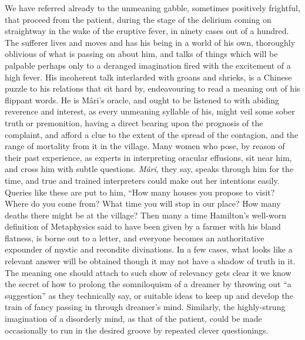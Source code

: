 \documentclass[a4paper, 12pt, oneside, english, twocolumn]{article}
\begin{document}
We have referred already to the unmeaning gabble, sometimes positively frightful, that proceed from the patient, during the stage of the delirium coming on straightway in the wake of the eruptive fever, in ninety cases out of a hundred. The sufferer lives and moves and has his being in a world of his own, thoroughly oblivious of what is passing on about him, and talks of things which will be palpable perhaps only to a deranged imagination fired with the excitement of a high fever. His incoherent talk interlarded with groans and shrieks, is a Chinese puzzle to his relations that sit hard by, endeavouring to read a meaning out of his flippant words. He is Mâri's oracle, and ought to be listened to with abiding reverence and interest, as every unmeaning syllable of his, might veil some sober truth or premonition, having a direct bearing upon the prognosis of the complaint, and afford a clue to the extent of the spread of the contagion, and the range of mortality from it in the village. Many women who pose, by reason of their past experience, as experts in interpreting oracular effusions, sit near him, and cross him with subtle questions. \emph{Mâri}, they say, speaks through him for the time, and true and trained interpreters could make out her intentions easily. Queries like these are put to him, ``How many houses you propose to visit? Where do you come from? What time you will stop in our place? How many deaths there might be at the village? Then many a time Hamilton's well-worn definition of Metaphysics said to have been given by a farmer with his bland flatness, is borne out to a letter, and everyone becomes an authoritative expounder of mystic and recondite divinations. In a few cases, what looks like a relevant answer will be obtained though it may not have a shadow of truth in it. The meaning one should attach to such show of relevancy gets clear it we know the secret of how to prolong the somniloquism of a dreamer by throwing out ``a suggestion'' as they technically say, or suitable ideas to keep up and develop the train of fancy passing in through dreamer's mind. Similarly, the highly-strung imagination of a disorderly mind, as that of the patient, could be made occasionally to run in the desired groove by repeated clever questionings.
\end{document}
